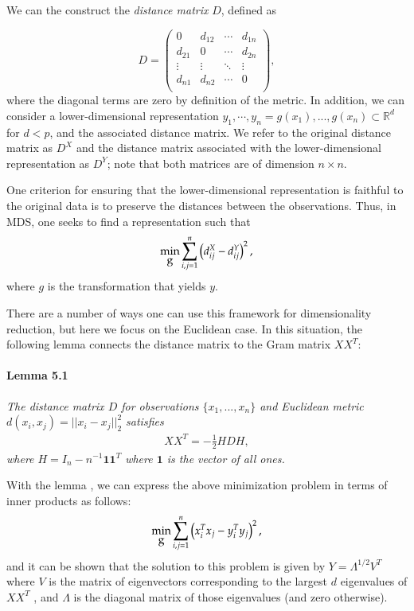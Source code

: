 \documentclass[12pt,letterpaper]{article}
\newcommand{\Rset}{\mathbb{R}}
\begin{document}
We can the construct the \emph{distance matrix} $D$, defined as 

\begin{equation}
\label{eq:X}
D  = 
 \begin{pmatrix}
  0 & d_{12} & \cdots & d_{1n} \\
  d_{21} & 0 & \cdots & d_{2n} \\
  \vdots  & \vdots  & \ddots & \vdots  \\
  d_{n1} & d_{n2} & \cdots & 0 \\
 \end{pmatrix},
 \end{equation}
where the diagonal terms are zero by definition of the metric. In addition, we can consider a lower-dimensional representation ${y_1, \cdots  , y_n } = {g(x_1 ), . . . , g(x_n )} \subset \Rset^d$ for $d < p$, and the associated distance matrix. We refer to the original distance matrix as $D^X$ and the distance matrix associated with the lower-dimensional representation as $D^Y$; note that both matrices are of dimension $n\times n$.

One criterion for ensuring that the lower-dimensional representation is faithful to the original data is to preserve the distances between the observations. Thus, in MDS, one seeks to find a representation such that
\begin{align*}
\stackunder{min}{g}\sum_{i,j=1}^n \left( d_{ij}^X - d_{ij}^Y\right)^2,
\end{align*}
where $g$ is the transformation that yields $y$. 

There are a number of ways one can use this framework for dimensionality reduction, but here we focus on the Euclidean case. In this situation, the following lemma connects the distance matrix to the Gram matrix $XX^T$:

\noindent
\paragraph*{\bf Lemma 5.1} \label{par:lemma5.1} \textit{The distance matrix $D$ for observations $\{x_1, . . . , x_n \}$ and Euclidean metric $d(x_i , x_j ) = || x_i - x_j ||^2_2 $ satisfies}
\begin{align}
XX^T = -\frac{1}{2}H D H,
\end{align}
\textit{where $H = I_n - n^{-1} \mathbf{11}^T$ where $\mathbf{1}$ is the vector of all ones.}

With the lemma , we can express the above minimization problem in terms of inner products as follows:
\begin{align}
\stackunder{min}{g}\sum_{i,j=1}^n \left(  x_i^Tx_j - y_i^Ty_j \right)^2,
\end{align}
and it can be shown that the solution to this problem is given by $Y =\Lambda^{ 1/2} V^T$ where $V$ is the matrix of eigenvectors corresponding to the largest $d$ eigenvalues of $XX^T$ , and $\Lambda$ is the diagonal matrix of those eigenvalues (and zero otherwise).
 
\end{document}
